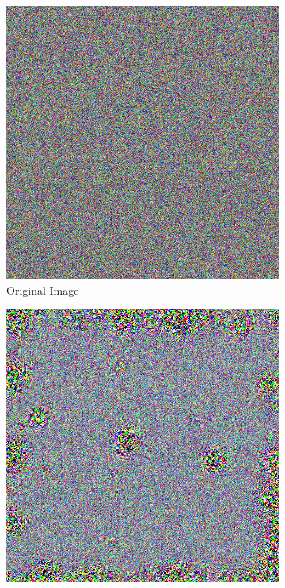 \begin{figure}
    \captionsetup{justification=centering}

    \begin{subfigure}[t]{0.28\textwidth}
        \captionsetup{justification=centering}
        \centering
        \includegraphics[width=.7\linewidth]{figuras/feat_vis/random_image.png}
        \caption{Original Image}
    \end{subfigure}
    \hfill
    \begin{subfigure}[t]{0.28\textwidth}
        \captionsetup{justification=centering}
        \centering
        \includegraphics[width=.7\linewidth]{figuras/feat_vis/random_image_dream.png}

\end{subfigure}
\end{figure}

